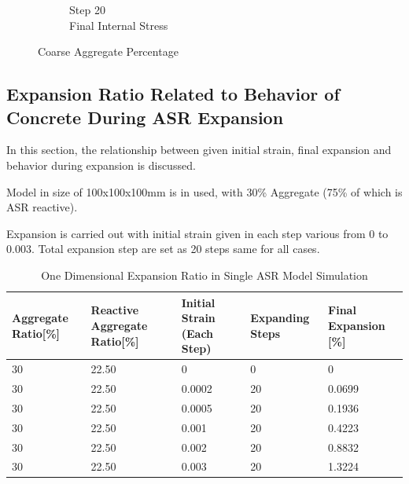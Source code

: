 \begin{figure}[ht!]
\begin{subfigure}{.25\textwidth}
      \caption{Step 20\\Final Internal Stress}
    \end{subfigure}

\caption{Coarse Aggregate Percentage}
\label{fig:ASR_A30P75_3}
\end{figure}

\subsection{Expansion Ratio Related to Behavior of Concrete During ASR Expansion}

In this section, the relationship between given initial strain, final expansion and behavior during expansion is discussed.

Model in size of 100x100x100mm is in used, with 30\% Aggregate (75\% of which is ASR reactive).

Expansion is carried out with initial strain given in each step various from 0 to 0.003. Total expansion step are set as 20 steps same for all cases.


\begin{table}[ht!]
\centering
\begin{tabular}{ ||p{2cm}|p{2cm}|p{2cm}|p{2cm}|p{2cm}|| }
 \hline
 Aggregate Ratio[\%] &  Reactive Aggregate Ratio[\%]  & Initial Strain (Each Step) & Expanding Steps & Final Expansion [\%] \\ [0.5ex]
 \hline\hline
 30 & 22.50 & 0 & 0 & 0\\
 30 & 22.50 & 0.0002 & 20 & 0.0699\\
 30 & 22.50 & 0.0005 & 20 & 0.1936\\
 30 & 22.50 & 0.001 & 20 & 0.4223\\
 30 & 22.50 & 0.002 & 20 & 0.8832\\
 30 & 22.50 & 0.003 & 20 & 1.3224\\ [0.5ex]
 \hline
\end{tabular}
\caption{One Dimensional Expansion Ratio in Single ASR Model Simulation}
\label{table:ASR_30_EXP}
\end{table}

